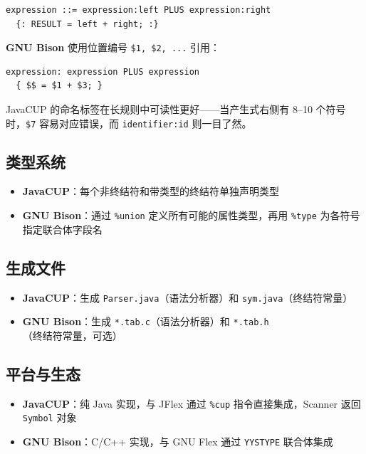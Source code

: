 \documentclass[12pt,a4paper,fontset=none]{ctexart}
\begin{document}
\begin{verbatim}
expression ::= expression:left PLUS expression:right
  {: RESULT = left + right; :}
\end{verbatim}

\textbf{GNU Bison} 使用位置编号 \texttt{\$1, \$2, ...} 引用：

\begin{verbatim}
expression: expression PLUS expression
  { $$ = $1 + $3; }
\end{verbatim}

JavaCUP 的命名标签在长规则中可读性更好——当产生式右侧有 8--10 个符号时，\texttt{\$7} 容易对应错误，而 \texttt{identifier:id} 则一目了然。

\subsection{类型系统}

\begin{itemize}
  \item \textbf{JavaCUP}：每个非终结符和带类型的终结符单独声明类型
  \item \textbf{GNU Bison}：通过 \texttt{\%union} 定义所有可能的属性类型，再用 \texttt{\%type} 为各符号指定联合体字段名
\end{itemize}

\subsection{生成文件}

\begin{itemize}
  \item \textbf{JavaCUP}：生成 \texttt{Parser.java}（语法分析器）和 \texttt{sym.java}（终结符常量）
  \item \textbf{GNU Bison}：生成 \texttt{*.tab.c}（语法分析器）和 \texttt{*.tab.h}（终结符常量，可选）
\end{itemize}

\subsection{平台与生态}

\begin{itemize}
  \item \textbf{JavaCUP}：纯 Java 实现，与 JFlex 通过 \texttt{\%cup} 指令直接集成，Scanner 返回 \texttt{Symbol} 对象
  \item \textbf{GNU Bison}：C/C++ 实现，与 GNU Flex 通过 \texttt{YYSTYPE} 联合体集成
\end{itemize}
\end{document}
